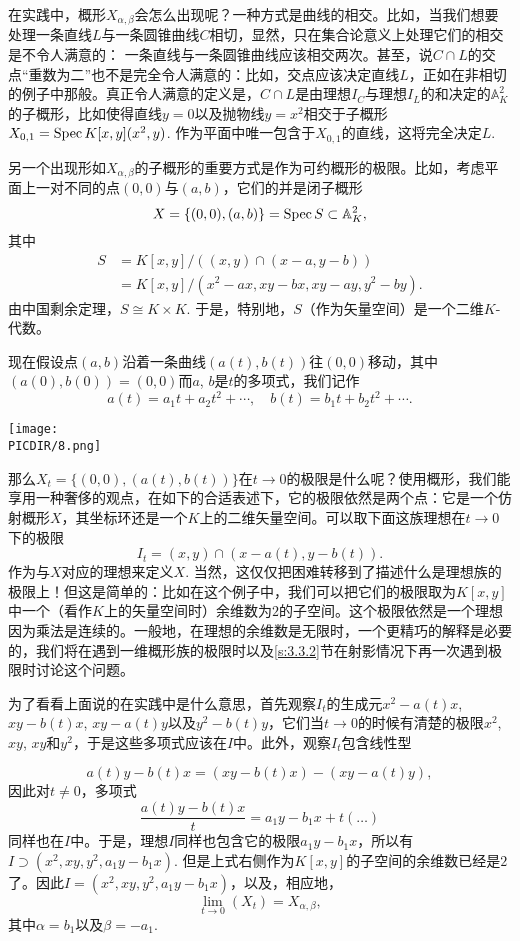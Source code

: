 \wrapa

在实践中，概形$X_{\alpha,\beta}$会怎么出现呢？一种方式是曲线的相交。比如，当我们想要处理一条直线$L$与一条圆锥曲线$C$相切，显然，只在集合论意义上处理它们的相交是不令人满意的：
一条直线与一条圆锥曲线应该相交两次。甚至，说$C\cap L$的交点“重数为二”也不是完全令人满意的：比如，交点应该决定直线$L$，正如在非相切的例子中那般。真正令人满意的定义是，$C\cap L$是由理想$I_C$与理想$I_L$的和决定的$\mathbb{A}_K^2$的子概形，比如使得直线$y=0$以及抛物线$y=x^2$相交于子概形$X_{0,1}=\operatorname{Spec} K[x,y](x^2,y)$. 作为平面中唯一包含于$X_{0,1}$的直线，这将完全决定$L$. 

另一个出现形如$X_{\alpha,\beta}$的子概形的重要方式是作为可约概形的极限。比如，考虑平面上一对不同的点$(0,0)$与$(a,b)$，它们的并是闭子概形
\[
	X=\{(0,0),(a,b)\}=\operatorname{Spec} S\subset \mathbb{A}_K^2,
\]
其中
\[
\begin{aligned}
	S&=K[x,y]/\left((x,y)\cap (x-a,y-b)\right)\\
	&=K[x,y]/(x^2-ax,xy-bx,xy-ay,y^2-by).
\end{aligned}
\]
由中国剩余定理，$S\cong K\times K$. 于是，特别地，$S$（作为矢量空间）是一个二维$K$\hyp 代数。

现在假设点$(a,b)$沿着一条曲线$(a(t),b(t))$往$(0,0)$移动，其中$(a(0),b(0))=(0,0)$而$a$, $b$是$t$的多项式，我们记作
\[
	a(t)=a_1t+a_2t^2+\cdots,\quad b(t)=b_1t+b_2t^2+\cdots.
\]

\begin{center}\texttt{[image: \\PICDIR/8.png]}\end{center}

那么$X_t=\{(0,0),(a(t),b(t))\}$在$t\to 0$的极限是什么呢？使用概形，我们能享用一种奢侈的观点，在如下的合适表述下，它的极限依然是两个点：它是一个仿射概形$X$，其坐标环还是一个$K$上的二维矢量空间。可以取下面这族理想在$t\to 0$下的极限
\[
	I_t=(x,y)\cap (x-a(t),y-b(t)).
\]
作为与$X$对应的理想来定义$X$. 当然，这仅仅把困难转移到了描述什么是理想族的极限上！但这是简单的：比如在这个例子中，我们可以把它们的极限取为$K[x,y]$
中一个（看作$K$上的矢量空间时）余维数为$2$的子空间。这个极限依然是一个理想因为乘法是连续的。一般地，在理想的余维数是无限时，一个更精巧的解释是必要的，我们将在遇到一维概形族的极限时以及\ref{s:3.3.2}节在射影情况下再一次遇到极限时讨论这个问题。

为了看看上面说的在实践中是什么意思，首先观察$I_t$的生成元$x^2-a(t)x$, $xy-b(t)x$, $xy-a(t)y$以及$y^2-b(t)y$，它们当$t\to 0$的时候有清楚的极限$x^2$, $xy$, $xy$和$y^2$，于是这些多项式应该在$I$中。此外，观察$I_t$包含线性型

\[
	a(t)y-b(t)x=(xy-b(t)x)-(xy-a(t)y),
\]
因此对$t\neq 0$，多项式
\[
	\frac{a(t)y-b(t)x}{t}=a_1y-b_1x+t(\dots)
\]
同样也在$I$中。于是，理想$I$同样也包含它的极限$a_1y-b_1x$，所以有$I\supset (x^2,xy,y^2,a_1y-b_1x)$. 但是上式右侧作为$K[x,y]$的子空间的余维数已经是$2$了。因此$I=(x^2,xy,y^2,a_1y-b_1x)$，以及，相应地，
\[
	\lim_{t\to 0}(X_t)=X_{\alpha,\beta},
\]
其中$\alpha=b_1$以及$\beta=-a_1$.

